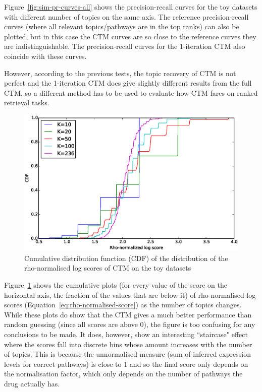 \documentclass[12pt,a4paper,twoside,openright]{report}
\begin{document}
Figure~\ref{fig:sim-pr-curves-all} shows the precision-recall curves for the toy datasets with different number of topics on the same axis. The reference precision-recall curves (where all relevant topics/pathways are in the top ranks) can also be plotted, but in this case the CTM curves are so close to the reference curves they are indistinguishable. The precision-recall curves for the 1-iteration CTM also coincide with these curves.

However, according to the previous tests, the topic recovery of CTM is not perfect and the 1-iteration CTM does give slightly different results from the full CTM, so a different method has to be used to evaluate how CTM fares on ranked retrieval tasks.

\begin{figure}[!htb]
\includegraphics[width=\textwidth]{sim-log.eps}
\caption{Cumulative distribution function (CDF) of the distribution of the rho-normalised log scores of CTM on the toy datasets}
\label{fig:sim-log}
\end{figure}

Figure~\ref{fig:sim-log} shows the cumulative plots (for every value of the score on the horizontal axis, the fraction of the values that are below it) of rho-normalised log scores (Equation~\ref{eq:rho-normalised-score}) as the number of topics changes. While these plots do show that the CTM gives a much better performance than random guessing (since all scores are above 0), the figure is too confusing for any conclusions to be made. It does, however, show an interesting ``staircase" effect where the scores fall into discrete bins whose amount increases with the number of topics. This is because the unnormalised measure (sum of inferred expression levels for correct pathways) is close to 1 and so the final score only depends on the normalisation factor, which only depends on the number of pathways the drug actually has.
\end{document}
